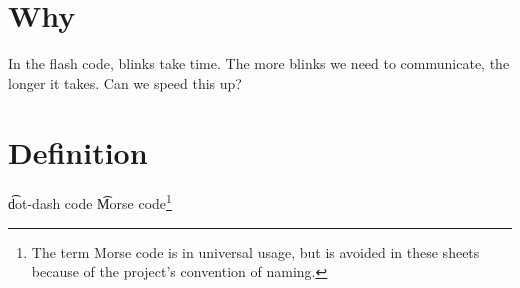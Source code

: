 

\section*{Why}

In the flash code, blinks take time.
The more blinks we need to communicate, the longer it takes.
Can we speed this up?

\section*{Definition}

\t{dot-dash code}
\t{Morse code}\footnote{The term Morse code is in universal usage, but is avoided in these sheets because of the project's convention of naming.}

\blankpage